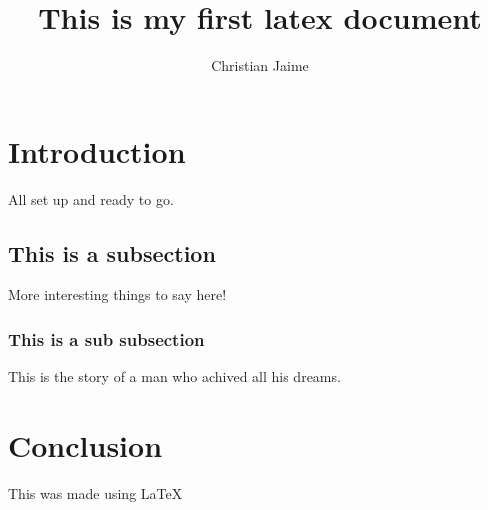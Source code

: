 \documentclass{article}
\title{This is my first latex document}
\author{Christian Jaime}
\date{} %
\begin{document}
\maketitle

\section{Introduction}
All set up and ready to go. 

\subsection{This is a subsection}
More interesting things to say here!

\subsubsection{This is a sub subsection}
This is the story of a man who achived all his dreams.

\section{Conclusion}
This was made using \LaTeX
\end{document}
